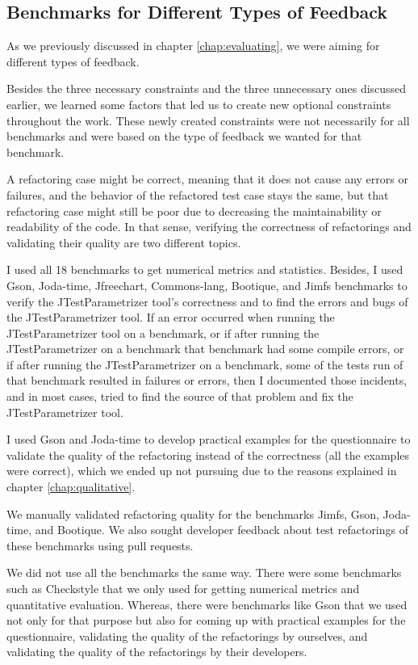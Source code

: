 \subsection{Benchmarks for Different Types of Feedback}

As we previously discussed in chapter \ref{chap:evaluating}, we were aiming for different types of feedback.

Besides the three necessary constraints and the three unnecessary ones discussed earlier, we learned some factors that led us to create new optional constraints throughout the work. These newly created constraints were not necessarily for all benchmarks and were based on the type of feedback we wanted for that benchmark.


A refactoring case might be correct, meaning that it does not cause any errors or failures, and the behavior of the refactored test case stays the same, but that refactoring case might still be poor due to decreasing the maintainability or readability of the code. In that sense, verifying the correctness of refactorings and validating their quality are two different topics.

I used all 18 benchmarks to get numerical metrics and statistics. Besides, I used Gson, Joda-time, Jfreechart, Commons-lang, Bootique, and Jimfs benchmarks to verify the JTestParametrizer tool's correctness and to find the errors and bugs of the JTestParametrizer tool. If an error occurred when running the JTestParametrizer tool on a benchmark, or if after running the JTestParametrizer on a benchmark that benchmark had some compile errors, or if after running the JTestParametrizer on a benchmark, some of the tests run of that benchmark resulted in failures or errors, then I documented those incidents, and in most cases, tried to find the source of that problem and fix the JTestParametrizer tool.

I used Gson and Joda-time to develop practical examples for the questionnaire to validate the quality of the refactoring instead of the correctness (all the examples were correct), which we ended up not pursuing due to the reasons explained in chapter \ref{chap:qualitative}.

We manually validated refactoring quality for the benchmarks Jimfs, Gson, Joda-time, and Bootique. We also sought developer feedback about test refactorings of these benchmarks using pull requests.

We did not use all the benchmarks the same way. There were some benchmarks such as Checkstyle that we only used for getting numerical metrics and quantitative evaluation. Whereas, there were benchmarks like Gson that we used not only for that purpose but also for coming up with practical examples for the questionnaire, validating the quality of the refactorings by ourselves, and validating the quality of the refactorings by their developers.
